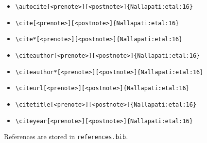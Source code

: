 \begin{itemize}
\item \verb=\autocite[<prenote>][<postnote>]{Nallapati:etal:16}= \newline  \autocite[<prenote>][<postnote>]{Nallapati:etal:16}
\item \verb=\cite[<prenote>][<postnote>]{Nallapati:etal:16}= \newline  \cite[<prenote>][<postnote>]{Nallapati:etal:16}
\item \verb=\cite*[<prenote>][<postnote>]{Nallapati:etal:16}= \newline  \cite*[<prenote>][<postnote>]{Nallapati:etal:16}
\item \verb=\citeauthor[<prenote>][<postnote>]{Nallapati:etal:16}= \newline \citeauthor[<prenote>][<postnote>]{Nallapati:etal:16}
\item \verb=\citeauthor*[<prenote>][<postnote>]{Nallapati:etal:16}= \newline \citeauthor*[<prenote>][<postnote>]{Nallapati:etal:16}
\item \verb=\citeurl[<prenote>][<postnote>]{Nallapati:etal:16}= \newline {}
\item \verb=\citetitle[<prenote>][<postnote>]{Nallapati:etal:16}= \newline {}
\item \verb=\citeyear[<prenote>][<postnote>]{Nallapati:etal:16}= \newline \citeyear[<prenote>][<postnote>]{Nallapati:etal:16}
\end{itemize} 

References are stored in \texttt{references.bib}.
